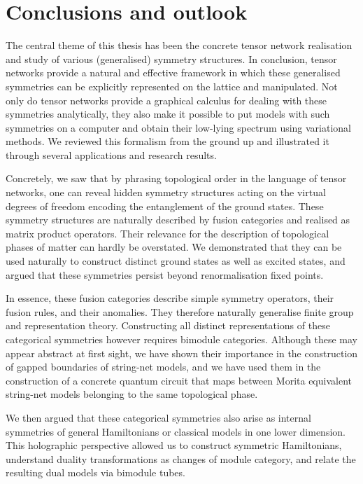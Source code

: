 \chapter{Conclusions and outlook}
The central theme of this thesis has been the concrete tensor network realisation and study of various (generalised) symmetry structures. In conclusion, tensor networks provide a natural and effective framework in which these generalised symmetries can be explicitly represented on the lattice and manipulated. Not only do tensor networks provide a graphical calculus for dealing with these symmetries analytically, they also make it possible to put models with such symmetries on a computer and obtain their low-lying spectrum using variational methods. We reviewed this formalism from the ground up and illustrated it through several applications and research results.

Concretely, we saw that by phrasing topological order in the language of tensor networks, one can reveal hidden symmetry structures acting on the virtual degrees of freedom encoding the entanglement of the ground states. These symmetry structures are naturally described by fusion categories and realised as matrix product operators. Their relevance for the description of topological phases of matter can hardly be overstated. We demonstrated that they can be used naturally to construct distinct ground states as well as excited states, and argued that these symmetries persist beyond renormalisation fixed points.

In essence, these fusion categories describe simple symmetry operators, their fusion rules, and their anomalies. They therefore naturally generalise finite group and representation theory. Constructing all distinct representations of these categorical symmetries however requires bimodule categories. Although these may appear abstract at first sight, we have shown their importance in the construction of gapped boundaries of string-net models, and we have used them in the construction of a concrete quantum circuit that maps between Morita equivalent string-net models belonging to the same topological phase.

We then argued that these categorical symmetries also arise as internal symmetries of general Hamiltonians or classical models in one lower dimension. This holographic perspective allowed us to construct symmetric Hamiltonians, understand duality transformations as changes of module category, and relate the resulting dual models via bimodule tubes.

